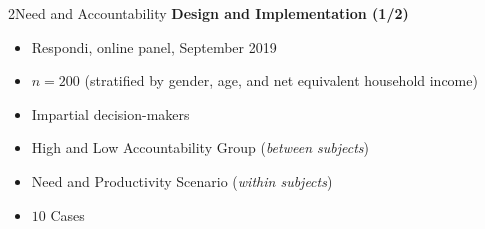 \documentclass[xcolor=table,9pt,aspectratio=169]{beamer}
\begin{document}
\begin{frame}{\vspace*{10mm}2\hspace*{1em}Need and Accountability}
\textbf{Design and Implementation (1/2)}\\
\medskip
\begin{itemize}
   \item Respondi, online panel, September 2019
   \item $n=200$ (stratified by gender, age, and net equivalent household income)
   \item Impartial decision-makers
   \item High and Low Accountability Group (\textit{between subjects})
   \item Need and Productivity Scenario (\textit{within subjects})
   \item $10$ Cases
\end{itemize}
\end{frame}
\end{document}
